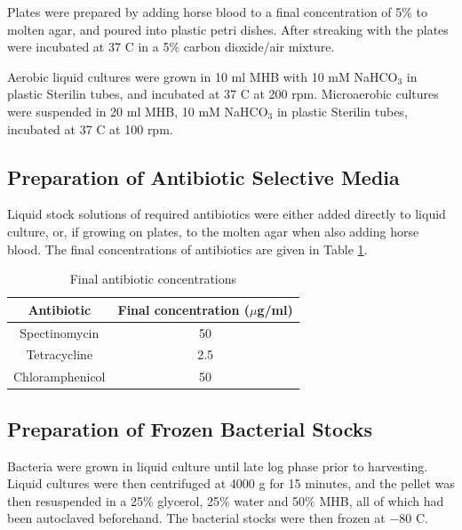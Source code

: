 Plates were prepared by adding horse blood to a final concentration of 5\% to molten agar, and poured into plastic petri dishes. After streaking with \Nm{} the plates were incubated at 37 \textdegree C in a 5\% carbon dioxide/air mixture.

Aerobic liquid cultures were grown in 10 ml MHB with 10 mM NaHCO$_\textrm{3}$ in plastic Sterilin tubes, and incubated at 37 \textdegree C at 200 rpm. Microaerobic cultures were suspended in 20 ml MHB, 10 mM NaHCO$_\textrm{3}$ in plastic Sterilin tubes, incubated at 37 \textdegree C at 100 rpm.

\subsection{Preparation of Antibiotic Selective Media}
Liquid stock solutions of required antibiotics were either added directly to liquid culture, or, if growing on plates, to the molten agar when also adding horse blood. The final concentrations of antibiotics are given in Table \ref{tab:antibiotic-concs}.

\begin{table}[here]%
\begin{center}
\begin{tabular}{cc}
\toprule
\textbf{Antibiotic} & \textbf{Final concentration ($\mu$g/ml)} \\
\midrule
Spectinomycin & 50 \\
Tetracycline & 2.5 \\
Chloramphenicol & 50 \\
\bottomrule
\end{tabular} 
\end{center}
\caption{Final antibiotic concentrations
\label{tab:antibiotic-concs}}
\end{table}

\subsection{Preparation of Frozen Bacterial Stocks}
Bacteria were grown in liquid culture until late log phase prior to harvesting. Liquid cultures were then centrifuged at 4000 g for 15 minutes, and the pellet was then resuspended in a 25\% glycerol, 25\% water and 50\% MHB, all of which had been autoclaved beforehand. The bacterial stocks were then frozen at $-80$ \textdegree C.

